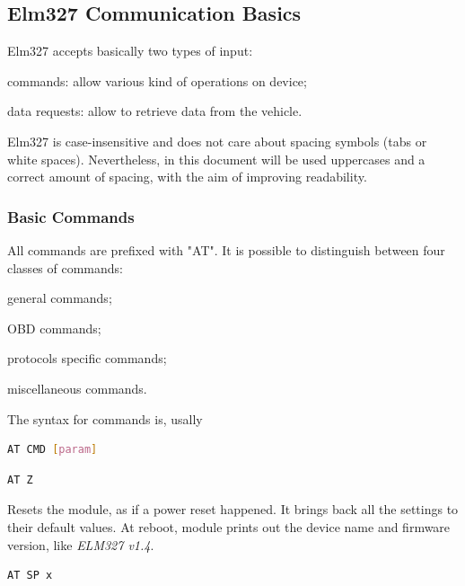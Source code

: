 \documentclass[twoside]{article}
\begin{document}
\begin{multicols}{2}
\subsection{Elm327 Communication Basics}

Elm327 accepts basically two types of input:
\begin{compactitem}
  \item commands: allow various kind of operations on device;
  \item data requests: allow to retrieve data from the vehicle.
\end{compactitem}

Elm327 is case-insensitive and does not care about spacing symbols (tabs or white spaces).
Nevertheless, in this document will be used uppercases and a correct amount of spacing, with the aim of improving readability.

\subsubsection{Basic Commands}

All commands are prefixed with "AT". It is possible to distinguish between four classes of commands:
\begin{compactitem}
  \item general commands;
  \item OBD commands;
  \item protocols specific commands;
  \item miscellaneous commands.
\end{compactitem}

The syntax for commands is, usally
\begin{lstlisting}[language=bash]
AT CMD [param]
\end{lstlisting}

\begin{lstlisting}[language=bash]
AT Z
\end{lstlisting}

Resets the module, as if a power reset happened.
It brings back all the settings to their default values.
At reboot, module prints out the device name and firmware version, like \emph{ELM327 v1.4}.

\begin{lstlisting}[language=bash]
AT SP x
\end{lstlisting}


\end{multicols}
\end{document}
